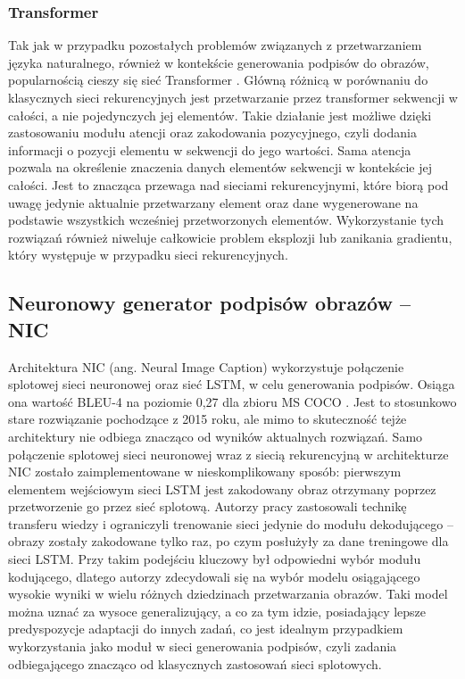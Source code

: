 \subsubsection{Transformer}
Tak jak w przypadku pozostałych problemów związanych z przetwarzaniem języka naturalnego, również w kontekście generowania podpisów do obrazów, popularnością cieszy się sieć Transformer \cite{transformer}. Główną różnicą w porównaniu do klasycznych sieci rekurencyjnych jest przetwarzanie przez transformer sekwencji w całości, a nie pojedynczych jej elementów. Takie działanie jest możliwe dzięki zastosowaniu modułu atencji oraz zakodowania pozycyjnego, czyli dodania informacji o pozycji elementu w sekwencji do jego wartości. Sama atencja pozwala na określenie znaczenia danych elementów sekwencji w kontekście jej całości. Jest to znacząca przewaga nad sieciami rekurencyjnymi, które biorą pod uwagę jedynie aktualnie przetwarzany element oraz dane wygenerowane na podstawie wszystkich wcześniej przetworzonych elementów. Wykorzystanie tych rozwiązań również niweluje całkowicie problem eksplozji lub zanikania gradientu, który występuje w przypadku sieci rekurencyjnych.

\subsection{Neuronowy generator podpisów obrazów -- NIC}
Architektura NIC \cite{nic} (ang. Neural Image Caption) wykorzystuje połączenie splotowej sieci neuronowej \cite{ioffe2015batch} oraz sieć LSTM, w celu generowania podpisów. Osiąga ona wartość BLEU-4 na poziomie 0,27 dla zbioru MS COCO \cite{mscoco}. Jest to stosunkowo stare rozwiązanie pochodzące z 2015 roku, ale mimo to skuteczność tejże architektury nie odbiega znacząco od wyników aktualnych rozwiązań. Samo połączenie splotowej sieci neuronowej wraz z siecią rekurencyjną w architekturze NIC zostało zaimplementowane w nieskomplikowany sposób: pierwszym elementem wejściowym sieci LSTM jest zakodowany obraz otrzymany poprzez przetworzenie go przez sieć splotową. Autorzy pracy zastosowali technikę transferu wiedzy i ograniczyli trenowanie sieci jedynie do modułu dekodującego -- obrazy zostały zakodowane tylko raz, po czym posłużyły za dane treningowe dla sieci LSTM. Przy takim podejściu kluczowy był odpowiedni wybór modułu kodującego, dlatego autorzy zdecydowali się na wybór modelu osiągającego wysokie wyniki w wielu różnych dziedzinach przetwarzania obrazów. Taki model można uznać za wysoce generalizujący, a co za tym idzie, posiadający lepsze predyspozycje adaptacji do innych zadań, co jest idealnym przypadkiem wykorzystania jako moduł w sieci generowania podpisów, czyli zadania odbiegającego znacząco od klasycznych zastosowań sieci splotowych.

